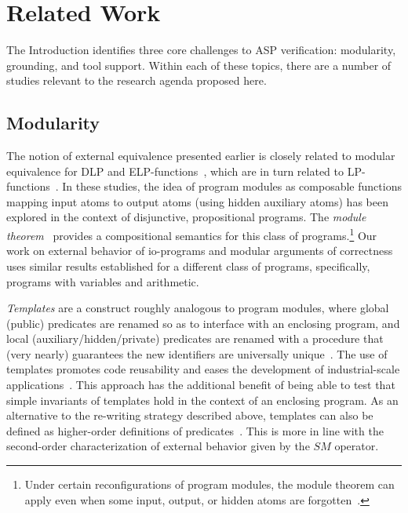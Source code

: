 \section{Related Work}
The Introduction identifies three core challenges to ASP verification: modularity, grounding, and tool support.
%
Within each of these topics, there are a number of studies relevant to the research agenda proposed here.



\subsection{Modularity}

The notion of external equivalence presented earlier is closely related to modular equivalence for DLP and ELP-functions~\cite{janoiktomwol09}, which are in turn related to LP-functions~\cite[Section~2]{gel02}.
%
In these studies, the idea of program modules as composable functions mapping input atoms to output atoms (using hidden auxiliary atoms) has been explored in the context of disjunctive, propositional programs.
%
The \emph{module theorem}~\cite{janoiktomwol09} provides a compositional semantics for this class of programs.\footnote{Under certain reconfigurations of program modules, the module theorem can apply even when some input, output, or hidden atoms are forgotten~\cite{gonjanknoleiwol19}.}
%
Our work on external behavior of io-programs and modular arguments of correctness uses similar results established for a different class of programs, specifically, programs with variables and arithmetic.

\emph{Templates} are a construct roughly analogous to program modules, where global (public) predicates are renamed so as to interface with an enclosing program, and local (auxiliary/hidden/private) predicates are renamed with a procedure that (very nearly) guarantees the new identifiers are universally unique~\cite{alvianpaczan23}.
%
The use of templates promotes code reusability and eases the development of industrial-scale applications~\cite{calian06}.
%
This approach has the additional benefit of being able to test that simple invariants of templates hold in the context of an enclosing program.
%
As an alternative to the re-writing strategy described above, templates can also be defined as higher-order definitions of predicates~\cite{dashaljanden15}.
%
This is more in line with the second-order characterization of external behavior given by the $SM$ operator.
%


